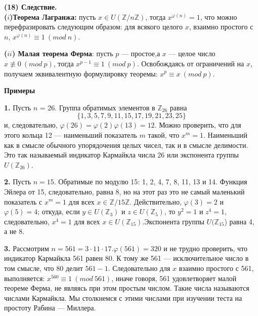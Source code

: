 \textbf{(18) Следствие.} \\
  \textbf{($i$)Теорема Лагранжа:} пусть $x \in U(\mathbb{Z}/n\mathbb{Z})$, тогда $x^{\varphi (n)} = 1$, что можно перефразировать следующим образом: для всякого целого $x$, взаимно простого с $n$, $x^{\varphi(n)} \equiv 1\ (mod\ n)$. \par
  \textbf{($ii$) Малая теорема Ферма}: пусть $p$ --- простое,а $x$ — целое 
число $x \not\equiv 0\ (mod\ p)$, тогда $x^{p - 1} \equiv 1\ (mod\ p)$. Освобождаясь от ограничений на $x$, получаем эквивалентную формулировку теоремы: $x^{p}\equiv x\ (mod\ p)$.
\pagebreak
\newpage

\textbf{Примеры} \par
 \textbf{1.} Пусть $n$ = 26. Группа обратимых элементов в $\mathbb{Z}_{26}$ равна
$$\{1,3,5,7,9,11,15,17,19,21,23,25\}$$
и, следовательно, $\varphi (26) = \varphi (2) \varphi (13) = 12$. Можно проверить, что для этого кольца 12 --- наименьший показатель $m$ такой, что $x^{m} = 1$. Наименьший как в смысле обычного упорядочения целых чисел, так и в
смысле делимости. Это так называемый индикатор Кармайкла числа 26 или экспонента группы $U(\mathbb{Z}_{26})$. \par
  \textbf{2.} Пусть $n = 15$. Обратимые по модулю 15: 1, 2, 4, 7, 8, 11, 13
и 14. Функция Эйлера от 15, следовательно, равна 8, но на этот раз
это не самый маленький показатель с $x^{m} = 1$ для всех $x \in \mathbb{Z}/15\mathbb{Z}$. Действительно, $\varphi(3) = 2$ и $\varphi(5) = 4$; откуда, если $y \in U(\mathbb{Z}_{3})$ и $z \in U(\mathbb{Z}_5)$, то $y^{2} = 1$ и $z^4 = 1$, следовательно, $x^4 = 1$ для всех $x \in U(\mathbb{Z}_{15})$.Экспонента группы $U(\mathbb{Z}_{15}$) равна 4, а не 8. \par
  \textbf{3.} Рассмотрим $n = 561 = 3 \cdot 11 \cdot 17$.$\varphi (561) = 320$ и не трудно проверить, что индикатор Кармайкла 561 равен 80. К тому же 561 --- исключительное число в том смысле, что 80 делит $561 - 1$. Следовательно
для $x$ взаимно простого с 561, выполняется: $x^{560} \equiv 1\ (mod\ 561)$, 
иначе говоря, 561 удовлетворяет малой теореме Ферма, не являясь при этом простым числом. Такие числа называются числами Кармайкла. Мы столкнемся с этими числами при изучении теста на простоту Рабина — Миллера. \\
